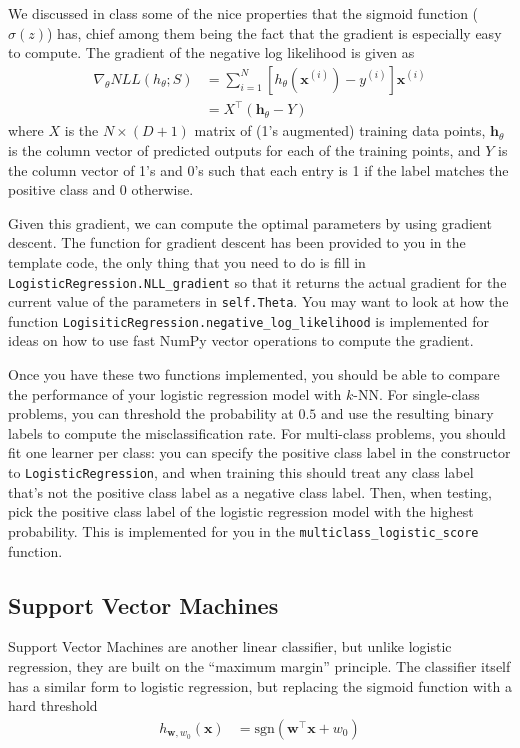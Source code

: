 \documentclass{article}
\begin{document}
We discussed in class some of the nice properties that the sigmoid function (\(\sigma(z)\)) has, chief among them being the fact that the gradient is especially easy to compute. The gradient of the negative log likelihood is given as
\begin{align}
	\nabla_\theta NLL(h_\theta;S) &= \sum_{i=1}^N \left[ h_\theta(\mathbf{x}^{(i)})-y^{(i)} \right] \mathbf{x}^{(i)}\\
	&= X^\top(\mathbf{h}_\theta - Y)
\end{align}
where \(X\) is the \(N\times(D+1)\) matrix of (1's augmented) training data points, \(\mathbf{h}_\theta\) is the column vector of predicted outputs for each of the training points, and \(Y\) is the column vector of 1's and 0's such that each entry is 1 if the label matches the positive class and 0 otherwise.

Given this gradient, we can compute the optimal parameters by using gradient descent. The function for gradient descent has been provided to you in the template code, the only thing that you need to do is fill in \texttt{LogisticRegression.NLL\_gradient} so that it returns the actual gradient for the current value of the parameters in \texttt{self.Theta}. You may want to look at how the function \texttt{LogisiticRegression.negative\_log\_likelihood} is implemented for ideas on how to use fast NumPy vector operations to compute the gradient.

Once you have these two functions implemented, you should be able to compare the performance of your logistic regression model with \(k\)-NN. For single-class problems, you can threshold the probability at \(0.5\) and use the resulting binary labels to compute the misclassification rate. For multi-class problems, you should fit one learner per class: you can specify the positive class label in the constructor to \texttt{LogisticRegression}, and when training this should treat any class label that's not the positive class label as a negative class label. Then, when testing, pick the positive class label of the logistic regression model with the highest probability. This is implemented for you in the \texttt{multiclass\_logistic\_score} function.

\subsection*{Support Vector Machines}

Support Vector Machines are another linear classifier, but unlike logistic regression, they are built on the ``maximum margin'' principle. The classifier itself has a similar form to logistic regression, but replacing the sigmoid function with a hard threshold
\begin{align}
	h_{\mathbf{w},w_0}(\mathbf{x}) &= \text{sgn}(\mathbf{w}^\top\mathbf{x}+w_0)
\end{align}
\end{document}
